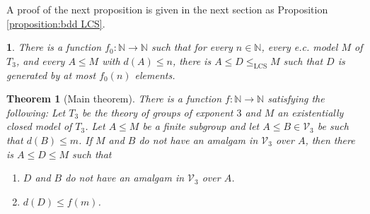 \documentclass[11pt,reqno]{article}
\newtheorem{theorem}{Theorem}[section]
\newcommand{\custompropositiontitle}{}
\newtheorem*{custompropositioninner}{\custompropositiontitle}
\newenvironment{customproposition}[1]
  {\renewcommand{\custompropositiontitle}{Proposition #1}%
   \begin{custompropositioninner}}
  {\end{custompropositioninner}}
\theoremstyle{definition}
\theoremstyle{remark}
\newcommand{\LCS}{\mathrm{LCS}}
\begin{document}
A proof of the next proposition is given in the next section as Proposition \ref{proposition:bdd LCS}.
\begin{customproposition}{A}
    There is a function $f_0:\mathbb N\to\mathbb N$ such that for every $n\in\mathbb N$, every e.c. model $M$ of $T_3$, and every $A\leq M$ with $d(A)\leq n$, there is $A\leq D\leq_{\LCS}M$ such that $D$ is generated by at most $f_0(n)$ elements.
\end{customproposition}


\begin{theorem}[Main theorem]
\label{thm:main}
There is a function $f:\mathbb N\to \mathbb N$ satisfying the following:
Let $T_3$ be the theory of groups of exponent $3$ and $M$ an existentially closed model of $T_3$.
Let $A\leq M$ be a finite subgroup and let $A\leq B\in\mathcal V_3$ be such that $d(B)\leq m$.
If $M$ and $B$ do not have an amalgam in $\mathcal V_3$ over $A$, then there is $A\leq D\leq M$ such that 
\begin{enumerate}
    \item $D$ and $B$ do not have an amalgam in $\mathcal V_3$ over $A$.
    \item $d(D)\leq f(m)$.
\end{enumerate}
\end{theorem}
\end{document}

